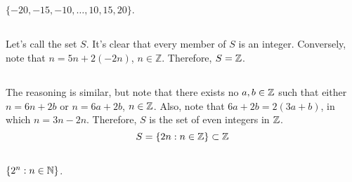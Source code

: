    \subsection{} $\{-20,-15,-10,\ldots,10,15,20\}$.
   \subsection{} Let's call the set $S$. It's clear that every member of $S$ is
   an integer. Conversely, note that $n=5n+2(-2n)$, $n \in \mathbb{Z}$. Therefore,
   $S=\mathbb{Z}$.
   \subsection{} The reasoning is similar, but note that there exists no $a,b \in \mathbb{Z}$
   such that either $n=6n+2b$ or $n=6a+2b$, $n \in \mathbb{Z}$. Also, note that
   $6a+2b=2(3a+b)$, in which $n=3n-2n$. Therefore, $S$ is the set of even integers in $\mathbb{Z}$.
   \begin{equation}
     S = \{2n: n \in \mathbb{Z}\} \subset \mathbb{Z}
   \end{equation}

   \subsection{} $\{2^n: n\in\mathbb{N}\}$.
   \subsection{}
   \subsection{}
